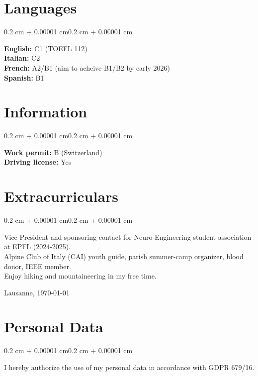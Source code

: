 \documentclass[10pt, letterpaper]{article}
\newenvironment{onecolentry}{
    \begin{adjustwidth}{0.2 cm + 0.00001 cm}{0.2 cm + 0.00001 cm}
}{
    \end{adjustwidth}
}
\begin{document}
    \section{Languages}

    \begin{onecolentry}
        \textbf{English:}  C1 (TOEFL 112) \\
        \textbf{Italian:}  C2   \\
        \textbf{French:}  A2/B1 (aim to acheive B1/B2 by early 2026) \\
        \textbf{Spanish:}  B1\\
    \end{onecolentry}
    
    \section{Information}

    \begin{onecolentry}
        \textbf{Work permit:} B (Switzerland) \\
        \textbf{Driving license:} Yes  \\
    \end{onecolentry}


    
    \section{Extracurriculars}

    \begin{onecolentry}
            Vice President and sponsoring contact for Neuro Engineering student association at EPFL (2024-2025). \\Alpine Club of Italy (CAI) youth guide, parish summer-camp organizer, blood donor, IEEE member. \\ 
        Enjoy hiking and mountaineering in my free time.
    \end{onecolentry}
    \vspace{\fill}
    Lausanne, \today

    \section{Personal Data}
    \begin{onecolentry}
        I hereby authorize the use of my personal data in accordance with GDPR 679/16.
    \end{onecolentry}
\end{document}
